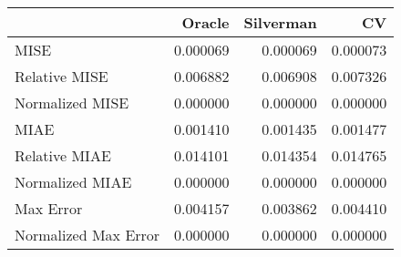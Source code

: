 \begin{tabular}{lrrr}
  \hline
 & Oracle & Silverman & CV \\ 
  \hline
MISE & 0.000069 & 0.000069 & 0.000073 \\ 
  Relative MISE & 0.006882 & 0.006908 & 0.007326 \\ 
  Normalized MISE & 0.000000 & 0.000000 & 0.000000 \\ 
  MIAE & 0.001410 & 0.001435 & 0.001477 \\ 
  Relative MIAE & 0.014101 & 0.014354 & 0.014765 \\ 
  Normalized MIAE & 0.000000 & 0.000000 & 0.000000 \\ 
  Max Error & 0.004157 & 0.003862 & 0.004410 \\ 
  Normalized Max Error & 0.000000 & 0.000000 & 0.000000 \\ 
   \hline
\end{tabular}
